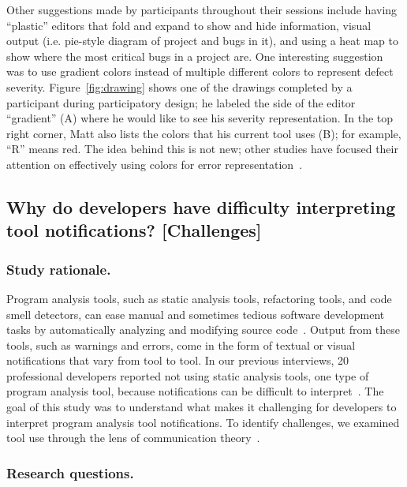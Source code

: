 \documentclass{llncs}
\begin{document}
Other suggestions made by participants throughout their sessions include having ``plastic'' editors that fold and expand to show and hide information, visual output (i.e. pie-style diagram of project and bugs in it), and using a heat map to show where the most critical bugs in a project are. One interesting suggestion was to use gradient colors instead of multiple different colors to represent defect severity. Figure~\ref{fig:drawing} shows one of the drawings completed by a participant during participatory design; he labeled the side of the editor ``gradient'' (A) where he would like to see his severity representation. In the top right corner, Matt also lists the colors that his current tool uses (B); for example, ``R'' means red. The idea behind this is not new; other studies have focused their attention on effectively using colors for error representation~\cite{Oberg:1992:Gradients,Murphy-Hill:2010:Ambient}.



\subsection{Why do developers have difficulty interpreting tool notifications? [Challenges]}\label{subsec:s2}
\subsubsection{Study rationale.} Program analysis tools, such as static analysis tools, refactoring tools, and code smell detectors, can ease manual and sometimes tedious software development tasks by automatically analyzing and modifying source code~\cite{adolph2011using,Murphy-Hill:2010:Ambient}. 
Output from these tools, such as warnings and errors, come in the form of textual or visual notifications that vary from tool to tool.
In our previous interviews, 20 professional developers reported not using static analysis tools, one type of program analysis tool, because notifications can be difficult to interpret~\cite{johnson2013don}. The goal of this study was to understand what makes it challenging for developers to interpret program analysis tool notifications. To identify challenges, we examined tool use through the lens of communication theory~\cite{bowman1987modeling}. 

\subsubsection{Research questions.}
\end{document}
